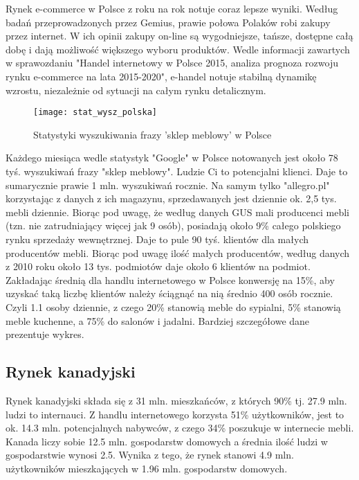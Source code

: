 		\par Rynek e-commerce w Polsce z roku na rok notuje coraz lepsze wyniki. Według badań przeprowadzonych przez Gemius, prawie połowa Polaków robi zakupy przez internet. W ich opinii zakupy on-line są wygodniejsze, tańsze, dostępne całą dobę i dają możliwość większego wyboru produktów. Wedle informacji zawartych w sprawozdaniu "Handel internetowy w Polsce 2015, analiza prognoza rozwoju rynku e-commerce  na lata 2015-2020", e-handel notuje stabilną dynamikę wzrostu, niezależnie od sytuacji na całym rynku detalicznym.
		
	
		\begin{figure}[H]
			\centering
			\texttt{[image: stat\_wysz\_polska]}
			\caption{Statystyki wyszukiwania frazy 'sklep meblowy' w Polsce}
			\label{search_pl}
		\end{figure}
	 
		\par Każdego miesiąca wedle statystyk "Google" w Polsce notowanych jest około 78 tyś. wyszukiwań frazy "sklep meblowy". Ludzie Ci to potencjalni klienci. Daje to sumarycznie prawie 1 mln. wyszukiwań rocznie. Na samym tylko "allegro.pl" korzystając z danych z ich magazynu, sprzedawanych jest dziennie ok. 2,5 tys. mebli dziennie. Biorąc pod uwagę, że według danych GUS mali producenci mebli (tzn. nie zatrudniający więcej jak 9 osób), posiadają  około 9\% całego polskiego rynku sprzedaży wewnętrznej. Daje to pule 90 tyś. klientów dla małych producentów mebli. Biorąc pod uwagę ilość małych producentów, według danych z 2010 roku około 13 tys. podmiotów daje około 6 klientów na podmiot. Zakładając średnią dla handlu internetowego w Polsce konwersję na 15\%,  aby uzyskać taką liczbę klientów należy ściągnąć na nią średnio 400 osób rocznie. Czyli 1.1 osoby dziennie, z czego 20\% stanowią meble do sypialni, 5\% stanowią meble kuchenne, a 75\% do salonów i jadalni.
		Bardziej szczegółowe dane prezentuje wykres.
	
	\subsection{Rynek kanadyjski}
		\par Rynek kanadyjski składa się z 31 mln. mieszkańców, z których 90\% tj. 27.9 mln. ludzi to internauci. Z handlu internetowego korzysta 51\% użytkowników, jest to ok. 14.3 mln. potencjalnych nabywców, z czego 34\% poszukuje w internecie mebli. Kanada liczy sobie 12.5 mln. gospodarstw domowych a średnia ilość ludzi w gospodarstwie wynosi 2.5.  Wynika z tego, że rynek stanowi 4.9 mln. użytkowników mieszkających w 1.96 mln. gospodarstw domowych. 

